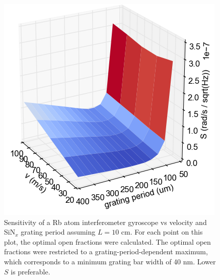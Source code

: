 \documentclass[twocolumn,pra,showpacs,superscriptaddress,longbibliography]{revtex4-1}   %
\begin{document}
\begin{figure}
\includegraphics[width=\linewidth,keepaspectratio]{../plots/Sf1f2_vs_dv_Rb_L10cm_cropped.png}
\caption{\label{S_vs_dv} Sensitivity of a Rb atom interferometer gyroscope vs velocity and SiN$_x$ grating period assuming $L=10$ cm. For each point on this plot, the optimal open fractions were calculated. The optimal open fractions were restricted to a grating-period-dependent maximum, which corresponds to a minimum grating bar width of 40 nm. Lower $S$ is preferable.}
\end{figure}
\end{document}
